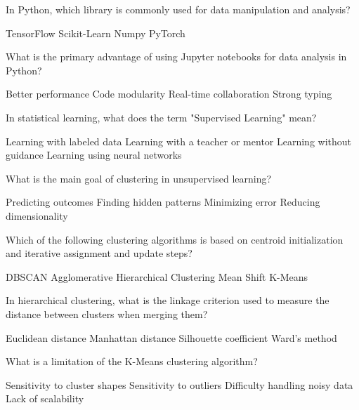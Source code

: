 \documentclass[a4paper,11pt,addpoints]{exam}
\begin{document}
\begin{questions}

\question[1] In Python, which library is commonly used for data manipulation and analysis?
\begin{choices}
\choice TensorFlow
\choice Scikit-Learn
\CorrectChoice Numpy
\choice PyTorch
\end{choices}

\question[1] What is the primary advantage of using Jupyter notebooks for data analysis in Python?
\begin{choices}
\choice Better performance
\CorrectChoice Code modularity 
\choice Real-time collaboration
\choice Strong typing
\end{choices}

\question[1] In statistical learning, what does the term "Supervised Learning" mean?
\begin{choices}
\CorrectChoice Learning with labeled data 
\choice Learning with a teacher or mentor
\choice Learning without guidance
\choice Learning using neural networks
\end{choices}

\question[1]  What is the main goal of clustering in unsupervised learning?
\begin{choices}
\choice  Predicting outcomes
\choice Finding hidden patterns
\CorrectChoice Minimizing error
\choice Reducing dimensionality
\end{choices}

\question[1] Which of the following clustering algorithms is based on centroid initialization and iterative assignment and update steps?
\begin{choices}
\choice DBSCAN
\choice Agglomerative Hierarchical Clustering
\choice Mean Shift
\CorrectChoice K-Means 
\end{choices}

\question[1] In hierarchical clustering, what is the linkage criterion used to measure the distance between clusters when merging them?
\begin{choices}
\choice Euclidean distance
\choice Manhattan distance
\choice Silhouette coefficient
\CorrectChoice Ward's method 
\end{choices}

\question[1] What is a limitation of the K-Means clustering algorithm?
\begin{choices}
\choice Sensitivity to cluster shapes
\CorrectChoice Sensitivity to outliers
\choice Difficulty handling noisy data
\choice  Lack of scalability
\end{choices}


\end{questions}
\end{document}
